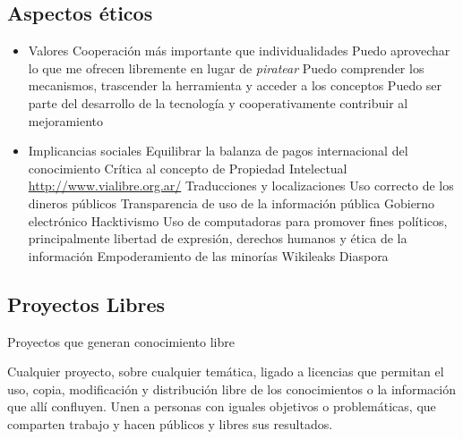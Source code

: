 


\subsection {Aspectos éticos}
\begin{itemize}
	\item Valores
	\subitem Cooperación más importante que individualidades
	\subsubitem {}
	\subsubitem {}
	\subsubitem {}
	\subitem Puedo aprovechar lo que me ofrecen libremente en
lugar de \emph{piratear}
	\subitem Puedo comprender los mecanismos, trascender la herramienta y acceder a los conceptos
	\subitem Puedo ser parte del desarrollo de la tecnología y cooperativamente contribuir al mejoramiento

	\item Implicancias sociales
	\subitem Equilibrar la balanza de pagos internacional del conocimiento
	\subitem Crítica al concepto de Propiedad Intelectual
		\subsubitem \url{http://www.vialibre.org.ar/}
	\subitem Traducciones y localizaciones
	\subitem Uso correcto de los dineros públicos
	\subitem Transparencia de uso de la información pública
	\subitem Gobierno electrónico
	\subitem Hacktivismo
	\subsubitem Uso de computadoras para promover fines políticos, principalmente libertad de expresión, derechos humanos y ética de la información
	\subsubitem Empoderamiento de las minorías
	\subsubitem Wikileaks
	\subsubitem Diaspora
\end{itemize}


\subsection{Proyectos Libres}

Proyectos que generan conocimiento libre

Cualquier proyecto, sobre cualquier temática, ligado a licencias que permitan el uso, copia, modificación y distribución libre de los conocimientos o la información que allí confluyen. Unen a personas con iguales objetivos o problemáticas, que comparten trabajo y hacen públicos y libres sus resultados.


